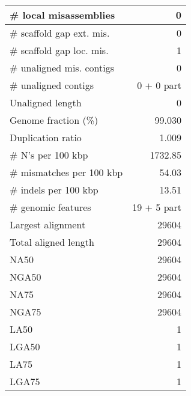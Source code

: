\documentclass[12pt,a4paper]{article}
\begin{document}
\begin{table}[ht]
\begin{center}
\begin{tabular}{|l*{1}{|r}|}
\# local misassemblies & 0 \\ \hline
\# scaffold gap ext. mis. & 0 \\ \hline
\# scaffold gap loc. mis. & 1 \\ \hline
\# unaligned mis. contigs & 0 \\ \hline
\# unaligned contigs & 0 + 0 part \\ \hline
Unaligned length & 0 \\ \hline
Genome fraction (\%) & 99.030 \\ \hline
Duplication ratio & 1.009 \\ \hline
\# N's per 100 kbp & 1732.85 \\ \hline
\# mismatches per 100 kbp & 54.03 \\ \hline
\# indels per 100 kbp & 13.51 \\ \hline
\# genomic features & 19 + 5 part \\ \hline
Largest alignment & 29604 \\ \hline
Total aligned length & 29604 \\ \hline
NA50 & 29604 \\ \hline
NGA50 & 29604 \\ \hline
NA75 & 29604 \\ \hline
NGA75 & 29604 \\ \hline
LA50 & 1 \\ \hline
LGA50 & 1 \\ \hline
LA75 & 1 \\ \hline
LGA75 & 1 \\ \hline
\end{tabular}
\end{center}
\end{table}
\end{document}
